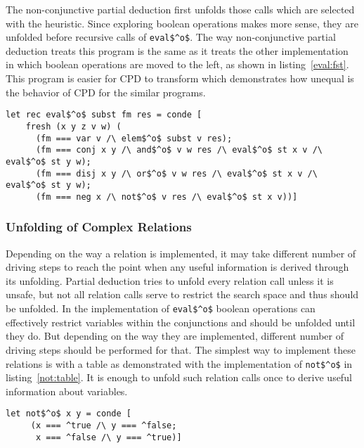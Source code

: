 The non-conjunctive partial deduction first unfolds those calls which are selected with the heuristic.
Since exploring boolean operations makes more sense, they are unfolded before recursive calls of \lstinline{eval$^o$}.
The way non-conjunctive partial deduction treats this program is the same as it treats the other implementation in which boolean operations are moved to the left, as shown in listing~\ref{eval:fst}.
This program is easier for CPD to transform which demonstrates how unequal is the behavior of CPD for the similar programs.

\begin{figure*}[!h]
  \centering
  \begin{minipage}{0.85\textwidth}
    \begin{lstlisting}[label={eval:fst}, caption={Evaluator of formulas with boolean operation second}, captionpos=b, frame=tb]
  let rec eval$^o$ subst fm res = conde [
    fresh (x y z v w) (
      (fm === var v /\ elem$^o$ subst v res);
      (fm === conj x y /\ and$^o$ v w res /\ eval$^o$ st x v /\ eval$^o$ st y w);
      (fm === disj x y /\ or$^o$ v w res /\ eval$^o$ st x v /\ eval$^o$ st y w);
      (fm === neg x /\ not$^o$ v res /\ eval$^o$ st x v))]
    \end{lstlisting}
  \end{minipage}
\end{figure*}

\subsubsection{Unfolding of Complex Relations}

Depending on the way a relation is implemented, it may take different number of driving steps to reach the point when any useful information is derived through its unfolding.
Partial deduction tries to unfold every relation call unless it is unsafe, but not all relation calls serve to restrict the search space and thus should be unfolded.
In the implementation of \lstinline{eval$^o$} boolean operations can effectively restrict variables within the conjunctions and should be unfolded until they do.
But depending on the way they are implemented, different number of driving steps should be performed for that.
The simplest way to implement these relations is with a table as demonstrated with the implementation of \lstinline{not$^o$} in listing~\ref{not:table}.
It is enough to unfold such relation calls once to derive useful information about variables.

\begin{figure*}[!h]
  \centering
  \begin{minipage}{0.45\textwidth}
    \begin{lstlisting}[label={not:table}, caption={Implementation of boolean \lstinline{not} as a table}, captionpos=b, frame=tb]
  let not$^o$ x y = conde [
     (x === ^true /\ y === ^false;
      x === ^false /\ y === ^true)]
    \end{lstlisting}
  \end{minipage}
\end{figure*}

